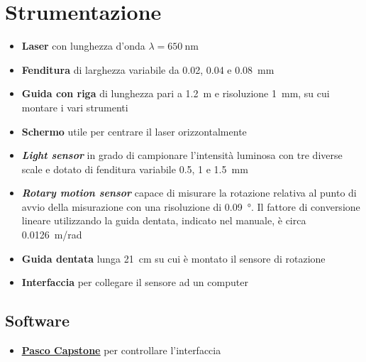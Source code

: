 \documentclass[../main.tex]{subfiles}
\begin{document}
\section{Strumentazione}

\begin{itemize}
    \item \textbf{Laser} con lunghezza d'onda $\lambda = \qty{650}{\nano\meter}$
    \item \textbf{Fenditura} di larghezza variabile da \num{0.02}, \num{0.04} e \qty{0.08}{\milli\meter}
    \item \textbf{Guida con riga} di lunghezza pari a \qty{1.2}{\meter} e risoluzione \qty{1}{\milli\meter}, su cui montare i vari strumenti
    \item \textbf{Schermo} utile per centrare il laser orizzontalmente
    \item \textbf{\textit{Light sensor}} in grado di campionare l'intensità luminosa con tre diverse scale e dotato di fenditura variabile \num{0.5}, \num{1} e \qty{1.5}{\milli\meter}
    \item \textbf{\textit{Rotary motion sensor}} capace di misurare la rotazione relativa al punto di avvio della misurazione con una risoluzione di \qty{0.09}{\degree}. Il fattore di conversione lineare utilizzando la guida dentata, indicato nel manuale, è circa \qty{0.0126}{\meter/\radian}
    \item \textbf{Guida dentata} lunga \qty{21}{\centi\meter} su cui è montato il sensore di rotazione
    \item \textbf{Interfaccia} per collegare il sensore ad un computer
\end{itemize}

\subsection{Software}

\begin{itemize}
    \item \textbf{\href{https://www.pasco.com/downloads/capstone}{\underline{Pasco Capstone}}} per controllare l'interfaccia
\end{itemize}
\end{document}
